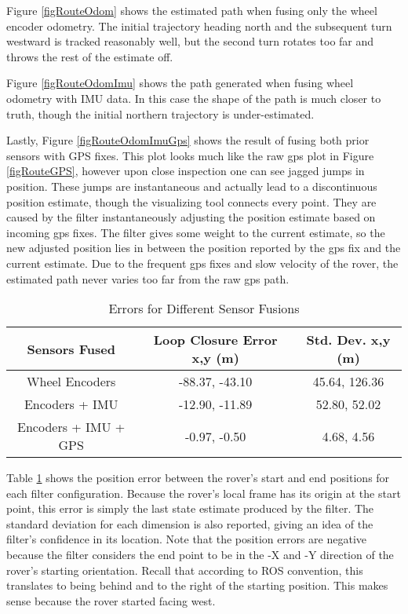 Figure \ref{figRouteOdom} shows the estimated path when fusing only the wheel encoder odometry. The initial trajectory heading north and the subsequent turn westward is tracked reasonably well, but the second turn rotates too far and throws the rest of the estimate off.

Figure \ref{figRouteOdomImu} shows the path generated when fusing wheel odometry with IMU data. In this case the shape of the path is much closer to truth, though the initial northern trajectory is under-estimated.

Lastly, Figure \ref{figRouteOdomImuGps} shows the result of fusing both prior sensors with GPS fixes. This plot looks much like the raw gps plot in Figure \ref{figRouteGPS}, however upon close inspection one can see jagged jumps in position. These jumps are instantaneous and actually lead to a discontinuous position estimate, though the visualizing tool connects every point. They are caused by the filter instantaneously adjusting the position estimate based on incoming gps fixes. The filter gives some weight to the current estimate, so the new adjusted position lies in between the position reported by the gps fix and the current estimate. Due to the frequent gps fixes and slow velocity of the rover, the estimated path never varies too far from the raw gps path.

\begin{table}[h]
	\caption {Errors for Different Sensor Fusions \cite{robot_localization_paper}} \label{tab:errors} 
	\begin{center}
		\begin{tabular}{|c|c|c|} \hline
			\textbf{Sensors Fused} & \textbf{Loop Closure Error x,y (m)} & \textbf{Std. Dev. x,y (m)} \\ \hline
			Wheel Encoders & -88.37, -43.10 & 45.64, 126.36 \\ \hline
			Encoders + IMU & -12.90, -11.89 & 52.80,  52.02 \\ \hline
			Encoders + IMU + GPS & -0.97, -0.50 & 4.68,  4.56 \\ \hline
		\end{tabular}
	\end{center}
\end{table}

Table \ref{tab:errors} shows the position error between the rover's start and end positions for each filter configuration. Because the rover's local frame has its origin at the start point, this error is simply the last state estimate produced by the filter. The standard deviation for each dimension is also reported, giving an idea of the filter's confidence in its location. Note that the position errors are negative because the filter considers the end point to be in the -X and -Y direction of the rover's starting orientation. Recall that according to ROS convention, this translates to being behind and to the right of the starting position. This makes sense because the rover started facing west.

